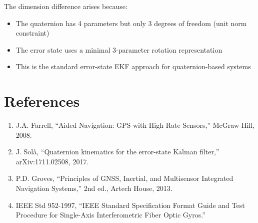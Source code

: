 \documentclass[11pt,a4paper]{article}
\begin{document}
The dimension difference arises because:
\begin{itemize}
    \item The quaternion has 4 parameters but only 3 degrees of freedom (unit norm constraint)
    \item The error state uses a minimal 3-parameter rotation representation
    \item This is the standard error-state EKF approach for quaternion-based systems
\end{itemize}

\section{References}

\begin{enumerate}
    \item J.A. Farrell, ``Aided Navigation: GPS with High Rate Sensors,'' McGraw-Hill, 2008.
    \item J. Sol\`{a}, ``Quaternion kinematics for the error-state Kalman filter,'' arXiv:1711.02508, 2017.
    \item P.D. Groves, ``Principles of GNSS, Inertial, and Multisensor Integrated Navigation Systems,'' 2nd ed., Artech House, 2013.
    \item IEEE Std 952-1997, ``IEEE Standard Specification Format Guide and Test Procedure for Single-Axis Interferometric Fiber Optic Gyros.''
\end{enumerate}
\end{document}
